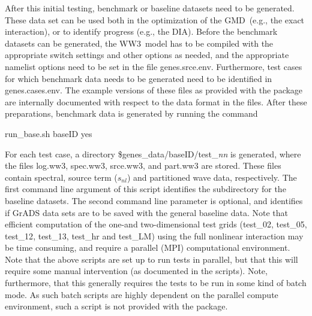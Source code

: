 \documentclass[12pt]{article}
\newcommand{\ws}{WW3}
\newcommand{\gmd}{GMD}
\newcommand{\file}{\sf}
\begin{document}
After this initial testing, benchmark or baseline datasets need to be
generated. These data set can be used both in the optimization of the \gmd\
(e.g., the exact interaction), or to identify progress (e.g., the DIA). Before
the benchmark datasets can be generated, the \ws\ model has to be compiled
with the appropriate switch settings and other options as needed, and the
appropriate namelist options need to be set in the file {\file
genes.srce.env}.  Furthermore, test cases for which benchmark data needs to be
generated need to be identified in {\file genes.cases.env}. The example
versions of these files as provided with the package are internally documented
with respect to the data format in the files.  After these preparations,
benchmark data is generated by running the command
\begin{center}
{\file run\_base.sh baseID yes}
\end{center}
\noindent
For each test case, a directory {\file \$genes\_data/baseID/test\_{\it nn}} is
generated, where the files {\file log.ww3}, {\file spec.ww3}, {\file
srce.ww3}, and {\file part.ww3} are stored. These files contain spectral,
source term ($s_{nl}$) and partitioned wave data, respectively.  The first
command line argument of this script identifies the subdirectory for the
baseline datasets. The second command line parameter is optional, and
identifies if GrADS data sets are to be saved with the general baseline data.
Note that efficient computation of the one-and two-dimensional test grids
({\file test\_02}, {\file test\_05}, {\file test\_12}, {\file test\_13},
{\file test\_hr} and {\file test\_LM}) using the full nonlinear interaction
may be time consuming, and require a parallel (MPI) computational environment.
Note that the above scripts are set up to run tests in parallel, but that this
will require some manual intervention (as documented in the scripts). Note,
furthermore, that this generally requires the tests to be run in some kind of
batch mode. As such batch scripts are highly dependent on the parallel compute
environment, such a script is not provided with the package.
\end{document}
